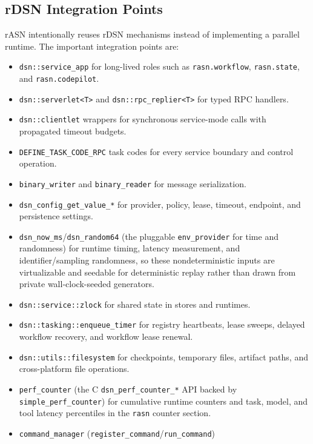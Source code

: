 \documentclass[manuscript,screen,review]{acmart}
\newcommand{\rasn}{rASN\xspace}
\begin{document}
\subsection{rDSN Integration Points}

\rasn intentionally reuses rDSN mechanisms instead of implementing a parallel
runtime. The important integration points are:

\begin{itemize}
  \item \texttt{dsn::service\_app} for long-lived roles such as
  \texttt{rasn.workflow}, \texttt{rasn.state}, and \texttt{rasn.codepilot}.
  \item \texttt{dsn::serverlet<T>} and \texttt{dsn::rpc\_replier<T>} for typed
  RPC handlers.
  \item \texttt{dsn::clientlet} wrappers for synchronous service-mode calls with
  propagated timeout budgets.
  \item \texttt{DEFINE\_TASK\_CODE\_RPC} task codes for every service boundary
  and control operation.
  \item \texttt{binary\_writer} and \texttt{binary\_reader} for message
  serialization.
  \item \texttt{dsn\_config\_get\_value\_*} for provider, policy, lease,
  timeout, endpoint, and persistence settings.
  \item \texttt{dsn\_now\_ms}/\texttt{dsn\_random64} (the pluggable
  \texttt{env\_provider} for time and randomness) for runtime timing, latency
  measurement, and identifier/sampling randomness, so these nondeterministic
  inputs are virtualizable and seedable for deterministic replay rather than
  drawn from private wall-clock-seeded generators.
  \item \texttt{dsn::service::zlock} for shared state in stores and runtimes.
  \item \texttt{dsn::tasking::enqueue\_timer} for registry heartbeats, lease
  sweeps, delayed workflow recovery, and workflow lease renewal.
  \item \texttt{dsn::utils::filesystem} for checkpoints, temporary files,
  artifact paths, and cross-platform file operations.
  \item \texttt{perf\_counter} (the C \texttt{dsn\_perf\_counter\_*} API backed by
  \texttt{simple\_perf\_counter}) for cumulative runtime counters and task,
  model, and tool latency percentiles in the \texttt{rasn} counter section.
  \item \texttt{command\_manager} (\texttt{register\_command}/\texttt{run\_command})

\end{itemize}
\end{document}

